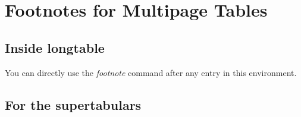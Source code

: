 \documentclass{article}
\begin{document}
	\newpage
	
	\section{Footnotes for Multipage Tables}
	
	\subsection{Inside longtable} 
	You can directly use the \emph{footnote} command
		after any entry in this environment.
		
	\subsection{For the supertabulars}
	\tabletail{\hline}
\end{document}
